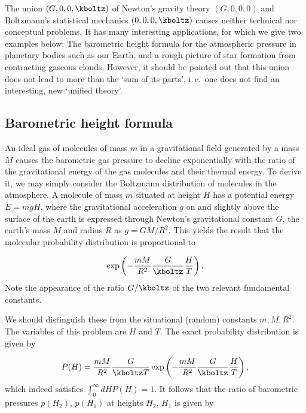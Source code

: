 \documentclass{scrartcl}
\begin{document}
The union $(G,0,0,\kboltz)$ of Newton's gravity theory $(G,0,0,0)$ and Boltzmann's statistical mechanics $(0,0,0,\kboltz)$ causes neither technical nor conceptual problems. It has many interesting applications, for which we give two examples below: The barometric height formula for the atmospheric pressure in planetary bodies such as our Earth, and a rough picture of star formation from contracting gaseous clouds. However, it should be pointed out that this union does not lead to more than the \enquote*{sum of its parts}, i.\,e.\ one does not find an interesting, new \enquote*{unified theory}.


\subsection*{Barometric height formula}

An ideal gas of molecules of mass $m$ in a gravitational field generated by a mass $M$ causes the barometric gas pressure to decline exponentially with the ratio of the gravitational energy of the gas molecules and their thermal energy. To derive it, we may simply consider the Boltzmann distribution of molecules in the atmosphere. A molecule of mass $m$ situated at height $H$ has a potential energy $E=m g H$, where the gravitational acceleration $g$ on and slightly above the surface of the earth is expressed through Newton's gravitational constant $G$, the earth's mass $M$ and radius $R$ as $g=G M/R^2$. This yields the result that the molecular probability distribution is proportional to 

\begin{equation*}\label{eq:barometric_height}
  \exp\left(-\frac{m M}{R^2}\frac{G}{\kboltz} \frac{H}{T}\right).
\end{equation*}
%
Note the appearance of the ratio $G/\kboltz$ of the two relevant fundamental constants.

We should distinguish these from the situational (random) constants $m, M, R^2$. The variables of this problem are $H$ and $T$. The exact probability distribution is given by

\begin{equation*}\label{eq:barometric_height_full_1}
  P(H)=\frac{m M}{R^2}\frac{G}{\kboltz T} \exp\left(-\frac{m M}{R^2}\frac{G}{\kboltz} \frac{H}{T}\right),
\end{equation*} 
%
which indeed satisfies $\int_0^\infty dH P(H)=1$. It follows that the ratio of barometric pressures $p(H_2)$, $p(H_1)$ at heights $H_2$, $H_1$ is given by
\end{document}
